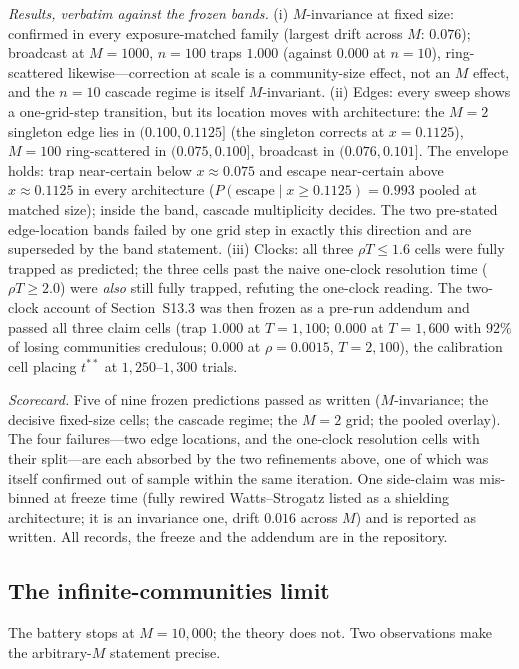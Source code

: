 \documentclass[11pt]{article}
\newcommand{\1}{\mathbf{1}}
\begin{document}
\emph{Results, verbatim against the frozen bands.} (i) $M$-invariance at fixed
size: confirmed in every exposure-matched family (largest drift across $M$:
$0.076$); broadcast at $M=1000$, $n=100$ traps $1.000$ (against $0.000$ at
$n=10$), ring-scattered likewise---correction at scale is a community-size
effect, not an $M$ effect, and the $n=10$ cascade regime is itself
$M$-invariant. (ii) Edges: every sweep shows a one-grid-step transition, but
its location moves with architecture: the $M=2$ singleton edge lies in
$(0.100,0.1125]$ (the singleton corrects at $x=0.1125$), $M=100$ ring-scattered
in $(0.075,0.100]$, broadcast in $(0.076,0.101]$. The envelope holds: trap
near-certain below $x\approx0.075$ and escape near-certain above
$x\approx0.1125$ in every architecture ($P(\mathrm{escape}\mid x\ge0.1125)=
0.993$ pooled at matched size); inside the band, cascade multiplicity decides.
The two pre-stated edge-location bands failed by one grid step in exactly this
direction and are superseded by the band statement. (iii) Clocks: all three
$\rho T\le1.6$ cells were fully trapped as predicted; the three cells past the
naive one-clock resolution time ($\rho T\ge2.0$) were \emph{also} still fully
trapped, refuting the one-clock reading. The two-clock account of
Section~S13.3 was then frozen as a pre-run addendum and passed all three claim
cells (trap $1.000$ at $T=1{,}100$; $0.000$ at $T=1{,}600$ with $92\%$ of
losing communities credulous; $0.000$ at $\rho=0.0015$, $T=2{,}100$), the
calibration cell placing $t^{**}$ at $1{,}250$--$1{,}300$ trials.

\emph{Scorecard.} Five of nine frozen predictions passed as written
($M$-invariance; the decisive fixed-size cells; the cascade regime; the $M=2$
grid; the pooled overlay). The four failures---two edge locations, and the
one-clock resolution cells with their split---are each absorbed by the two
refinements above, one of which was itself confirmed out of sample within the
same iteration. One side-claim was mis-binned at freeze time (fully rewired
Watts--Strogatz listed as a shielding architecture; it is an invariance one,
drift $0.016$ across $M$) and is reported as written. All records, the freeze
and the addendum are in the repository.

\subsection{The infinite-communities limit}
The battery stops at $M=10{,}000$; the theory does not. Two observations make the
arbitrary-$M$ statement precise.
\end{document}
